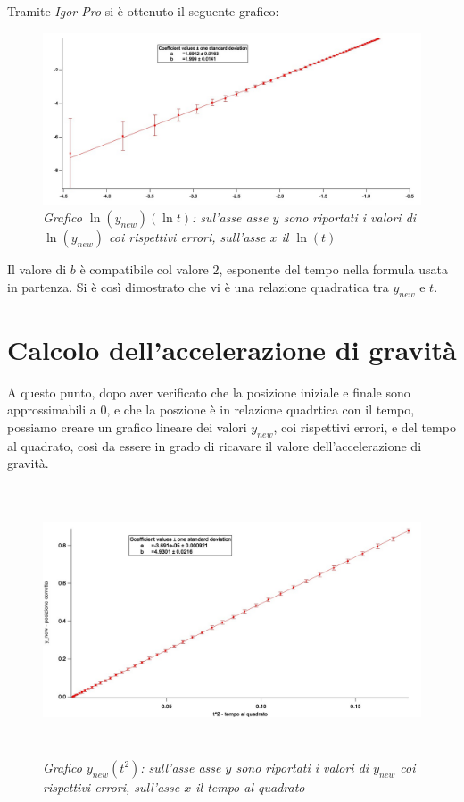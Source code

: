\documentclass[12pt, a4paper]{article}
\begin{document}
 Tramite \textit{Igor Pro} si è ottenuto il seguente grafico:\\
   \begin{figure}[h!]
\centering
\includegraphics[width=170mm]{Immagini/GraphLn.jpg}
\caption{\textit{{\footnotesize{Grafico $\ln{(y_{new})}(\ln{t})$: sul'asse asse $y$ sono riportati i valori di $\ln{(y_{new})}$ coi rispettivi errori, sull'asse $x$ il $\ln{(t)}$}}}}
\label{Grafico logaritmico}
\end{figure}

Il valore di $b$ è compatibile col valore $2$, esponente del tempo nella formula usata in partenza.  Si è così dimostrato che vi è una relazione quadratica tra $y_{new}$ e $t$.


\newpage
\section{Calcolo dell'accelerazione di gravità}
A questo punto, dopo aver verificato che la posizione iniziale e finale sono approssimabili a $0$, e che la poszione è in relazione quadrtica con il tempo, possiamo creare un grafico lineare dei valori $y_{new}$, coi rispettivi errori, e del tempo al quadrato, così da essere in grado di ricavare il valore dell'accelerazione di gravità. 

  \begin{figure}[h!]
\centering
\includegraphics[width=170mm, height=80mm]{Immagini/Graph5 non comp.jpg}
\caption{\textit{{\footnotesize{Grafico $y_{new}(t^2)$: sull'asse asse $y$ sono riportati i valori di $y_{new}$ coi rispettivi errori, sull'asse $x$ il tempo al quadrato}}}}
\label{Grafico logaritmico}
\end{figure}
\end{document}
